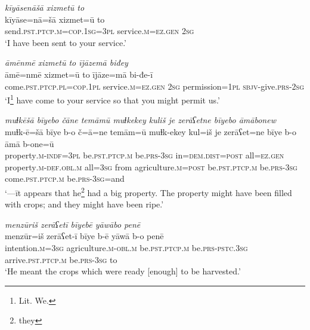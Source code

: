 \ea \label{PM.13}
\textit{kīyāsenāšā xizmetū to} \\ 
\gll kīyāse=nā=šā xizmet=ū to \\ 
 send\textsc{.pst}\textsc{.ptcp}\textsc{.m}\textsc{=cop}\textsc{.\textsc{1sg}}\textsc{=3pl} service\textsc{.m}\textsc{\textsc{=ez.gen}} \textsc{2sg} \\ 
\glt `I have been sent to your service.'
\z 
 
\ea \label{PM.15}
\textit{āmēnmē xizmetū to ījāzemā biđey} \\ 
\gll āmē=nmē xizmet=ū to ījāze=mā bi-đe-ī \\ 
 come\textsc{.pst}\textsc{.ptcp}\textsc{.pl}\textsc{=cop}\textsc{.1pl} service\textsc{.m}\textsc{\textsc{=ez.gen}} \textsc{2sg} permission\textsc{=1pl} \textsc{sbjv-}give\textsc{.prs}-\textsc{2sg} \\ 
\glt `I\footnote{Lit. We.} have come to your service so that you might permit us.'
\z 
 
\ea \label{PM.18}
\textit{muɫkēšā bīyebo čāne temāmū muɫkekey kuliš je zerāʕetne bīyebo āmābonew} \\ 
\gll muɫk-ē=šā bīye b-o č=ā=ne temām=ū muɫk-ekey kul=iš je zerāʕet=ne bīye b-o āmā b-one=ū \\ 
 property\textsc{.m}\textsc{-indf}\textsc{=3pl} be\textsc{.pst}\textsc{.ptcp}\textsc{.m} be\textsc{.prs}\textsc{-3sg} in=\textsc{dem.dist}\textsc{=\textsc{post}} all\textsc{\textsc{=ez.gen}} property\textsc{.m}\textsc{-def}\textsc{.obl}\textsc{.m} all\textsc{=3sg} from agriculture\textsc{.m}\textsc{=\textsc{post}} be\textsc{.pst}\textsc{.ptcp}\textsc{.m} be\textsc{.prs}\textsc{-3sg} come\textsc{.pst}\textsc{.ptcp}\textsc{.m} be\textsc{.prs}\textsc{-3sg}=and \\ 
\glt `—īt appears that he\footnote{they} had a big property. The property might have been filled with crops; and they might have been ripe.'
\z 
 
\ea \label{PM.19}
\textit{menzūriš zerāʕetī bīyebē yāwābo penē} \\ 
\gll menzūr=iš zerāʕet-ī bīye b-ē yāwā b-o penē \\ 
 intention\textsc{.m}\textsc{=3sg} agriculture\textsc{.m}\textsc{-obl}\textsc{.m} be\textsc{.pst}\textsc{.ptcp}\textsc{.m} be\textsc{.prs}\textsc{-pstc}\textsc{.3sg} arrive\textsc{.pst}\textsc{.ptcp}\textsc{.m} be\textsc{.prs}\textsc{-3sg} to \\ 
\glt `He meant the crops which were ready [enough] to be harvested.'
\z 
 
